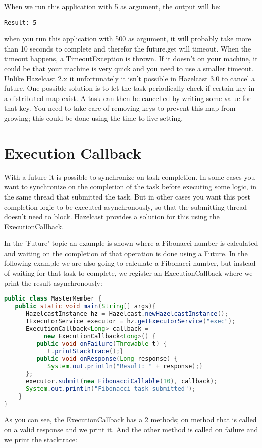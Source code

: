 When we run this application with 5 as argument, the output will be: 
\begin{lstlisting}
Result: 5
\end{lstlisting}
when you run this application with 500 as argument, it will probably take more than 10 seconds to complete and therefor the future.get will timeout. When the timeout happens, a TimeoutException is thrown. If it doesn't on your machine, it could be that your machine is very quick and you need to use a smaller timeout. Unlike Hazelcast 2.x it unfortunately it isn't possible in Hazelcast 3.0 to cancel a future. One possible solution is to let the task periodically check if certain key in a distributed map exist. A task can then be cancelled by writing some value for that key. You need to take care of removing keys to prevent this map from growing; this could be done using the time to live setting.

\section{Execution Callback}
With a future it is possible to synchronize on task completion. In some cases you want to synchronize on the completion of the task before executing some logic, in the same thread that submitted the task. But in other cases you want this post completion logic to be executed asynchronously, so that the submitting thread doesn't need to block. Hazelcast provides a solution for this using the ExecutionCallback.

In the 'Future' topic an example is shown where a Fibonacci number is calculated and waiting on the completion of that operation is done using a Future. In the following example we are also going to calculate a Fibonacci number, but instead of waiting for that task to complete, we register an ExecutionCallback where we print the result asynchronously:
\begin{lstlisting}[language=java]
public class MasterMember {
   public static void main(String[] args){
      HazelcastInstance hz = Hazelcast.newHazelcastInstance();
      IExecutorService executor = hz.getExecutorService("exec");
      ExecutionCallback<Long> callback = 
           new ExecutionCallback<Long>() {
         public void onFailure(Throwable t) {
            t.printStackTrace();}
         public void onResponse(Long response) {
            System.out.println("Result: " + response);}
      };
      executor.submit(new FibonacciCallable(10), callback);
      System.out.println("Fibonacci task submitted");
    }
}
\end{lstlisting}
As you can see, the ExecutionCallback has a 2 methods; on method that is called on a valid response and we print it. And the other method is called on failure and we print the stacktrace: 

